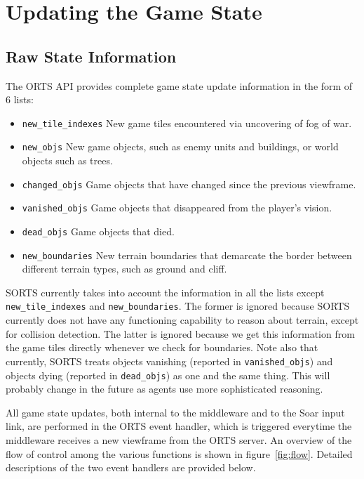 \section{Updating the Game State}

\subsection{Raw State Information}

The ORTS API provides complete game state update information in the form
of 6 lists:

\begin{itemize}
  \item \verb|new_tile_indexes| New game tiles encountered via
  uncovering of fog of war.
  \item \verb|new_objs| New game objects, such as enemy units and
  buildings, or world objects such as trees.
  \item \verb|changed_objs| Game objects that have changed since the
  previous viewframe.
  \item \verb|vanished_objs| Game objects that disappeared from the
  player's vision.
  \item \verb|dead_objs| Game objects that died.
  \item \verb|new_boundaries| New terrain boundaries that demarcate
  the border between different terrain types, such as ground and cliff.
\end{itemize}

SORTS currently takes into account the information in all
the lists except \verb|new_tile_indexes| and
\verb|new_boundaries|. The former is ignored because SORTS
currently does not have any functioning capability to reason about
terrain, except for collision detection. The latter is ignored because
we get this information from the game tiles directly whenever we check
for boundaries. Note also that currently, SORTS treats objects vanishing
(reported in \verb|vanished_objs|) and objects dying (reported in
\verb|dead_objs|) as one and the same thing. This will probably change
in the future as agents use more sophisticated reasoning.

All game state updates, both internal to the middleware and to the Soar
input link, are performed in the ORTS event handler, which is triggered
everytime the middleware receives a new viewframe from the ORTS server.
An overview of the flow of control among the various functions is shown
in figure~\ref{fig:flow}. Detailed descriptions of the two event
handlers are provided below.

